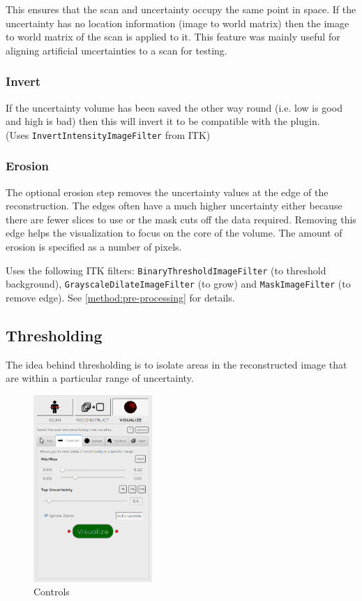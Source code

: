 This ensures that the scan and uncertainty occupy the same point in space. If the uncertainty has no location information (image to world matrix) then the image to world matrix of the scan is applied to it. This feature was mainly useful for aligning artificial uncertainties to a scan for testing.

\subsubsection*{Invert}
If the uncertainty volume has been saved the other way round (i.e. low is good and high is bad) then this will invert it to be compatible with the plugin.\\(Uses \texttt{InvertIntensityImageFilter} from ITK)

\subsubsection*{Erosion}
The optional erosion step removes the uncertainty values at the edge of the reconstruction. The edges often have a much higher uncertainty either because there are fewer slices to use or the mask cuts off the data required. Removing this edge helps the visualization to focus on the core of the volume. The amount of erosion is specified as a number of pixels.

Uses the following ITK filters: \texttt{BinaryThresholdImageFilter} (to threshold background), \texttt{GrayscaleDilateImageFilter} (to grow) and \texttt{MaskImageFilter} (to remove edge). See \ref{method:pre-processing} for details.

\clearpage
\subsection{Thresholding}\label{implementation:thresholding}
The idea behind thresholding is to isolate areas in the reconstructed image that are within a particular range of uncertainty. 

\begin{figure}
  \vspace{-20pt}
  \includegraphics[width=0.4\textwidth]{images/tool/2_thresholding.png}
  \caption{Controls}\label{fig:threshold_settings}
\end{figure}

